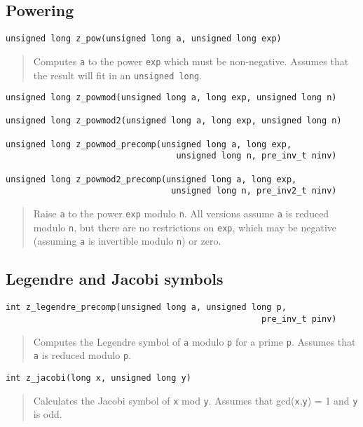\documentclass[a4paper,10pt]{article}
\newcommand{\code}{\lstinline}
\begin{document}
\subsection{Powering}
       
\begin{lstlisting}
unsigned long z_pow(unsigned long a, unsigned long exp)
\end{lstlisting}
\begin{quote}
Computes \code{a} to the power \code{exp} which must be non-negative. Assumes that the result will fit in an \code{unsigned long}.
\end{quote}
                            
\begin{lstlisting}
unsigned long z_powmod(unsigned long a, long exp, unsigned long n)

unsigned long z_powmod2(unsigned long a, long exp, unsigned long n)

unsigned long z_powmod_precomp(unsigned long a, long exp, 
                                  unsigned long n, pre_inv_t ninv)
                                     
unsigned long z_powmod2_precomp(unsigned long a, long exp, 
                                 unsigned long n, pre_inv2_t ninv)
\end{lstlisting}
\begin{quote}
Raise \code{a} to the power \code{exp} modulo \code{n}. All versions assume \code{a} is reduced modulo \code{n}, but there are no restrictions on \code{exp}, which may be negative (assuming \code{a} is invertible modulo \code{n}) or zero. 
\end{quote}                              

\subsection{Legendre and Jacobi symbols}

\begin{lstlisting}
int z_legendre_precomp(unsigned long a, unsigned long p, 
                                                   pre_inv_t pinv)
\end{lstlisting}
\begin{quote}
Computes the Legendre symbol of \code{a} modulo \code{p} for a prime \code{p}. Assumes that \code{a} is reduced modulo \code{p}.
\end{quote}

\begin{lstlisting}
int z_jacobi(long x, unsigned long y)
\end{lstlisting}
\begin{quote}
Calculates the Jacobi symbol of \code{x} mod \code{y}. Assumes that gcd(\code{x},\code{y}) = 1 and \code{y} is odd.  
\end{quote}
\end{document}
